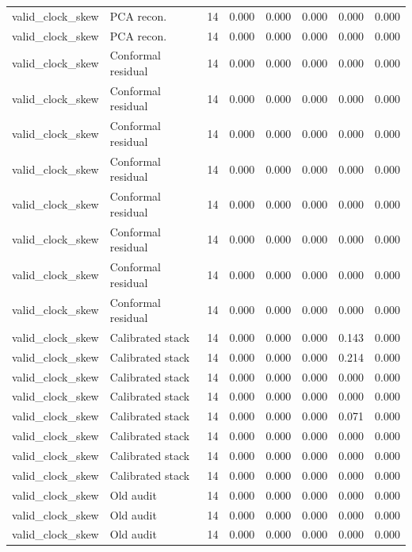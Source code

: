 {\begin{longtable}{llrrrrrr}
valid\_clock\_skew & PCA recon. & 14 & 0.000 & 0.000 & 0.000 & 0.000 & 0.000 \\
valid\_clock\_skew & PCA recon. & 14 & 0.000 & 0.000 & 0.000 & 0.000 & 0.000 \\
valid\_clock\_skew & Conformal residual & 14 & 0.000 & 0.000 & 0.000 & 0.000 & 0.000 \\
valid\_clock\_skew & Conformal residual & 14 & 0.000 & 0.000 & 0.000 & 0.000 & 0.000 \\
valid\_clock\_skew & Conformal residual & 14 & 0.000 & 0.000 & 0.000 & 0.000 & 0.000 \\
valid\_clock\_skew & Conformal residual & 14 & 0.000 & 0.000 & 0.000 & 0.000 & 0.000 \\
valid\_clock\_skew & Conformal residual & 14 & 0.000 & 0.000 & 0.000 & 0.000 & 0.000 \\
valid\_clock\_skew & Conformal residual & 14 & 0.000 & 0.000 & 0.000 & 0.000 & 0.000 \\
valid\_clock\_skew & Conformal residual & 14 & 0.000 & 0.000 & 0.000 & 0.000 & 0.000 \\
valid\_clock\_skew & Conformal residual & 14 & 0.000 & 0.000 & 0.000 & 0.000 & 0.000 \\
valid\_clock\_skew & Calibrated stack & 14 & 0.000 & 0.000 & 0.000 & 0.143 & 0.000 \\
valid\_clock\_skew & Calibrated stack & 14 & 0.000 & 0.000 & 0.000 & 0.214 & 0.000 \\
valid\_clock\_skew & Calibrated stack & 14 & 0.000 & 0.000 & 0.000 & 0.000 & 0.000 \\
valid\_clock\_skew & Calibrated stack & 14 & 0.000 & 0.000 & 0.000 & 0.000 & 0.000 \\
valid\_clock\_skew & Calibrated stack & 14 & 0.000 & 0.000 & 0.000 & 0.071 & 0.000 \\
valid\_clock\_skew & Calibrated stack & 14 & 0.000 & 0.000 & 0.000 & 0.000 & 0.000 \\
valid\_clock\_skew & Calibrated stack & 14 & 0.000 & 0.000 & 0.000 & 0.000 & 0.000 \\
valid\_clock\_skew & Calibrated stack & 14 & 0.000 & 0.000 & 0.000 & 0.000 & 0.000 \\
valid\_clock\_skew & Old audit & 14 & 0.000 & 0.000 & 0.000 & 0.000 & 0.000 \\
valid\_clock\_skew & Old audit & 14 & 0.000 & 0.000 & 0.000 & 0.000 & 0.000 \\
valid\_clock\_skew & Old audit & 14 & 0.000 & 0.000 & 0.000 & 0.000 & 0.000 \\

\end{longtable}}
